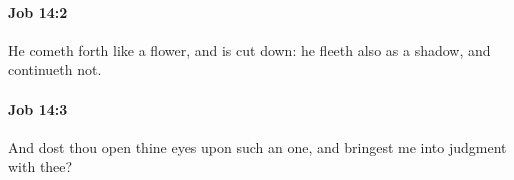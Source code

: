 		\paragraph{Job 14:2} %
			\label{JOB-14-2}

			He cometh forth like a flower, and is cut down: he fleeth also as a shadow, and continueth not.


		\paragraph{Job 14:3} %
			\label{JOB-14-3}

			And dost thou open thine eyes upon such an one, and bringest me into judgment with thee?


